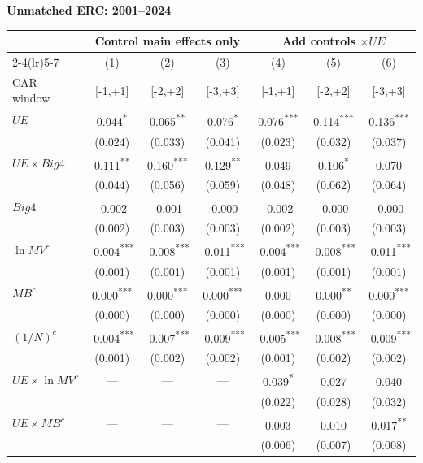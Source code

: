 \documentclass[10pt]{article}
\newcommand{\sym}[1]{\textsuperscript{#1}}
\begin{document}
\noindent\textbf{Unmatched ERC: 2001--2024}\par\medskip
\setlength{\tabcolsep}{4pt}\renewcommand{\arraystretch}{1.12}
\noindent\begin{tabular*}{\textwidth}{@{\extracolsep{\fill}}lcccccc@{}}\toprule
 & \multicolumn{3}{c}{Control main effects only} & \multicolumn{3}{c}{Add controls \(\times UE\)} \\
\cmidrule(lr){2-4}\cmidrule(lr){5-7}
 & (1) & (2) & (3) & (4) & (5) & (6) \\
CAR window & [-1,+1] & [-2,+2] & [-3,+3] & [-1,+1] & [-2,+2] & [-3,+3] \\\midrule
\(UE\) & 0.044\sym{*} & 0.065\sym{**} & 0.076\sym{*} & 0.076\sym{***} & 0.114\sym{***} & 0.136\sym{***} \\
 & (0.024) & (0.033) & (0.041) & (0.023) & (0.032) & (0.037) \\
\(UE\times Big4\) & 0.111\sym{**} & 0.160\sym{***} & 0.129\sym{**} & 0.049\sym{} & 0.106\sym{*} & 0.070\sym{} \\
 & (0.044) & (0.056) & (0.059) & (0.048) & (0.062) & (0.064) \\
\(Big4\) & -0.002\sym{} & -0.001\sym{} & -0.000\sym{} & -0.002\sym{} & -0.000\sym{} & -0.000\sym{} \\
 & (0.002) & (0.003) & (0.003) & (0.002) & (0.003) & (0.003) \\
\(\ln MV^c\) & -0.004\sym{***} & -0.008\sym{***} & -0.011\sym{***} & -0.004\sym{***} & -0.008\sym{***} & -0.011\sym{***} \\
 & (0.001) & (0.001) & (0.001) & (0.001) & (0.001) & (0.001) \\
\(MB^c\) & 0.000\sym{***} & 0.000\sym{***} & 0.000\sym{***} & 0.000\sym{} & 0.000\sym{**} & 0.000\sym{***} \\
 & (0.000) & (0.000) & (0.000) & (0.000) & (0.000) & (0.000) \\
\((1/N)^c\) & -0.004\sym{***} & -0.007\sym{***} & -0.009\sym{***} & -0.005\sym{***} & -0.008\sym{***} & -0.009\sym{***} \\
 & (0.001) & (0.002) & (0.002) & (0.001) & (0.002) & (0.002) \\
\(UE\times\ln MV^c\) & --- & --- & --- & 0.039\sym{*} & 0.027\sym{} & 0.040\sym{} \\
 &  &  &  & (0.022) & (0.028) & (0.032) \\
\(UE\times MB^c\) & --- & --- & --- & 0.003\sym{} & 0.010\sym{} & 0.017\sym{**} \\
 &  &  &  & (0.006) & (0.007) & (0.008) \\

\end{tabular*}
\end{document}
